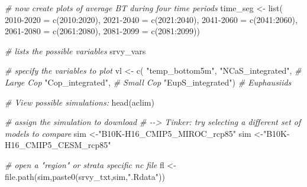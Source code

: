 \documentclass[
]{article}
\newenvironment{Shaded}{\begin{snugshade}}{\end{snugshade}}
\newcommand{\CommentTok}[1]{\textcolor[rgb]{0.56,0.35,0.01}{\textit{#1}}}
\newcommand{\DecValTok}[1]{\textcolor[rgb]{0.00,0.00,0.81}{#1}}
\newcommand{\FunctionTok}[1]{\textcolor[rgb]{0.00,0.00,0.00}{#1}}
\newcommand{\NormalTok}[1]{#1}
\newcommand{\OtherTok}[1]{\textcolor[rgb]{0.56,0.35,0.01}{#1}}
\newcommand{\SpecialCharTok}[1]{\textcolor[rgb]{0.00,0.00,0.00}{#1}}
\newcommand{\StringTok}[1]{\textcolor[rgb]{0.31,0.60,0.02}{#1}}
\begin{document}
\begin{Shaded}
\begin{Highlighting}[]
    \CommentTok{\# now create plots of average BT during four time periods}
\NormalTok{    time\_seg   }\OtherTok{\textless{}{-}} \FunctionTok{list}\NormalTok{( }\StringTok{\textquotesingle{}2010{-}2020\textquotesingle{}} \OtherTok{=} \FunctionTok{c}\NormalTok{(}\DecValTok{2010}\SpecialCharTok{:}\DecValTok{2020}\NormalTok{),}
                        \StringTok{\textquotesingle{}2021{-}2040\textquotesingle{}} \OtherTok{=} \FunctionTok{c}\NormalTok{(}\DecValTok{2021}\SpecialCharTok{:}\DecValTok{2040}\NormalTok{),}
                        \StringTok{\textquotesingle{}2041{-}2060\textquotesingle{}} \OtherTok{=} \FunctionTok{c}\NormalTok{(}\DecValTok{2041}\SpecialCharTok{:}\DecValTok{2060}\NormalTok{),}
                        \StringTok{\textquotesingle{}2061{-}2080\textquotesingle{}} \OtherTok{=} \FunctionTok{c}\NormalTok{(}\DecValTok{2061}\SpecialCharTok{:}\DecValTok{2080}\NormalTok{),}
                        \StringTok{\textquotesingle{}2081{-}2099\textquotesingle{}} \OtherTok{=} \FunctionTok{c}\NormalTok{(}\DecValTok{2081}\SpecialCharTok{:}\DecValTok{2099}\NormalTok{))}
    
    \CommentTok{\# lists the possible variables}
\NormalTok{    srvy\_vars}
    
    \CommentTok{\# specify the variables to plot}
\NormalTok{    vl        }\OtherTok{\textless{}{-}} \FunctionTok{c}\NormalTok{(}
                  \StringTok{"temp\_bottom5m"}\NormalTok{,}
                  \StringTok{"NCaS\_integrated"}\NormalTok{, }\CommentTok{\# Large Cop}
                  \StringTok{"Cop\_integrated"}\NormalTok{,  }\CommentTok{\# Small Cop}
                  \StringTok{"EupS\_integrated"}\NormalTok{) }\CommentTok{\# Euphausiids}
    
    \CommentTok{\# View possible simulations:}
    \FunctionTok{head}\NormalTok{(aclim)}
    
    \CommentTok{\# assign the simulation to download}
    \CommentTok{\# {-}{-}\textgreater{} Tinker: try selecting a different set of models to compare}
\NormalTok{    sim        }\OtherTok{\textless{}{-}}\StringTok{"B10K{-}H16\_CMIP5\_MIROC\_rcp85"} 
\NormalTok{     sim        }\OtherTok{\textless{}{-}}\StringTok{"B10K{-}H16\_CMIP5\_CESM\_rcp85"}
    
    \CommentTok{\# open a "region" or strata specific nc file}
\NormalTok{    fl         }\OtherTok{\textless{}{-}} \FunctionTok{file.path}\NormalTok{(sim,}\FunctionTok{paste0}\NormalTok{(srvy\_txt,sim,}\StringTok{".Rdata"}\NormalTok{))}
    

\end{Highlighting}
\end{Shaded}
\end{document}
